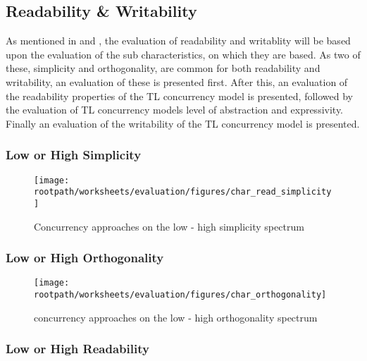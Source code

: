 \subsection{Readability \& Writability}\label{subsec:tl_charac_read_and_write}
As mentioned in  and , the evaluation of readability and writablity will be based upon the evaluation of the sub characteristics, on which they are based. As two of these, simplicity and orthogonality, are common for both readability and writability, an evaluation of these is presented first. After this, an evaluation of the readability properties of the \ac{TL} concurrency model is presented, followed by the evaluation of \ac{TL} concurrency models level of abstraction and expressivity. Finally an evaluation of the writability of the \ac{TL} concurrency model is presented.

\subsubsection{Low or High Simplicity}\label{subsec:simplicity}
\begin{figure}[htbp]
\centering
 \texttt{[image: \\rootpath/worksheets/evaluation/figures/char\_read\_simplicity]} 
 \caption{Concurrency approaches on the low - high simplicity spectrum}
\label{fig:char_simplicity}
\end{figure}

\subsubsection{Low or High Orthogonality}\label{subsec:orthogonality}

\begin{figure}[htbp]
\centering
 \texttt{[image: \\rootpath/worksheets/evaluation/figures/char\_orthogonality]} 
 \caption{concurrency approaches on the low - high orthogonality spectrum}
\label{fig:char_orthogonality}
\end{figure}

\subsubsection{Low or High Readability}
\label{subsec:char_readability}

